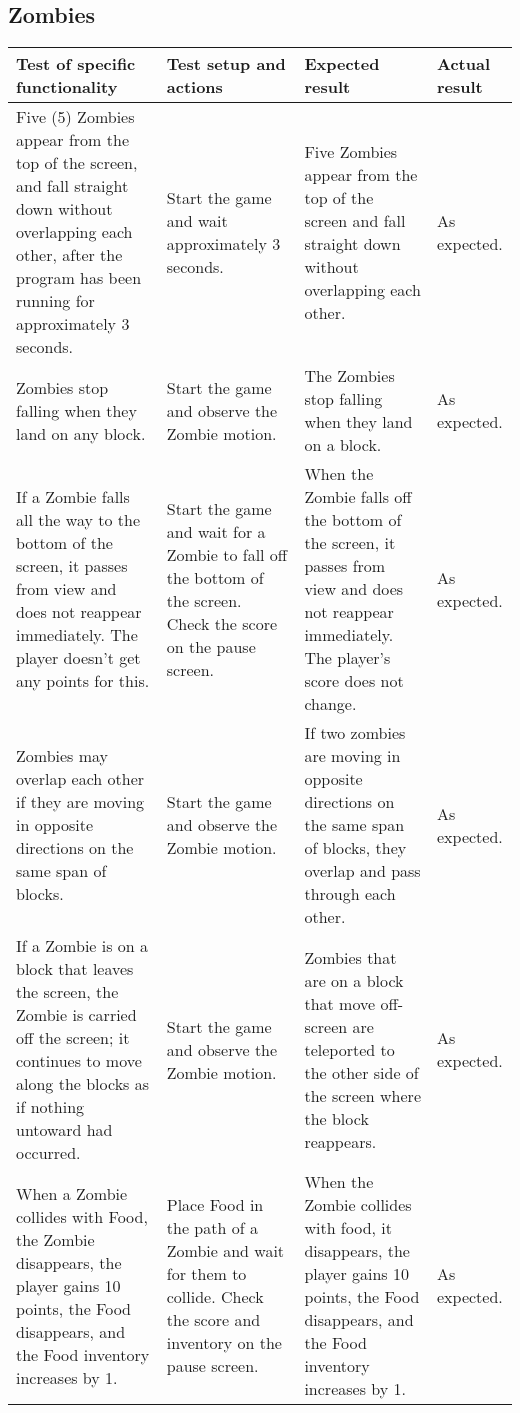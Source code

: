 \documentclass[10pt, titlepage]{article}
\newenvironment{testplan}[1]
{
\newcommand{\test}[4]{\midrule ##1 & ##2 & ##3 & ##4 \\}
\subsection{#1}
\begin{longtable}{L{0.3\textwidth}L{0.2\textwidth}L{0.25\textwidth}L{0.15\textwidth}}
\toprule
\textbf{Test of specific functionality} & \textbf{Test setup and actions} & \textbf{Expected result} & \textbf{Actual result} \\
}
{
\bottomrule
\end{longtable}
}
\begin{document}
\begin{testplan}{Zombies}
\test{Five (5) Zombies appear from the top of the screen, and fall straight down without overlapping each other, after the program has been running for approximately 3 seconds.}{Start the game and wait approximately 3 seconds.}{Five Zombies appear from the top of the screen and fall straight down without overlapping each other.}{As expected.}
\test{Zombies stop falling when they land on any block.}{Start the game and observe the Zombie motion.}{The Zombies stop falling when they land on a block.}{As expected.}
\test{If a Zombie falls all the way to the bottom of the screen, it passes from view and does not reappear immediately. The player doesn't get any points for this.}{Start the game and wait for a Zombie to fall off the bottom of the screen. Check the score on the pause screen.}{When the Zombie falls off the bottom of the screen, it passes from view and does not reappear immediately. The player's score does not change.}{As expected.}
\test{Zombies may overlap each other if they are moving in opposite directions on the same span of blocks.}{Start the game and observe the Zombie motion.}{If two zombies are moving in opposite directions on the same span of blocks, they overlap and pass through each other.}{As expected.}
\test{If a Zombie is on a block that leaves the screen, the Zombie is carried off the screen; it continues to move along the blocks as if nothing untoward had occurred.}{Start the game and observe the Zombie motion.}{Zombies that are on a block that move off-screen are teleported to the other side of the screen where the block reappears.}{As expected.}
\test{When a Zombie collides with Food, the Zombie disappears, the player gains 10 points, the Food disappears, and the Food inventory increases by 1.}{Place Food in the path of a Zombie and wait for them to collide. Check the score and inventory on the pause screen.}{When the Zombie collides with food, it disappears, the player gains 10 points, the Food disappears, and the Food inventory increases by 1.}{As expected.}

\end{testplan}
\end{document}
